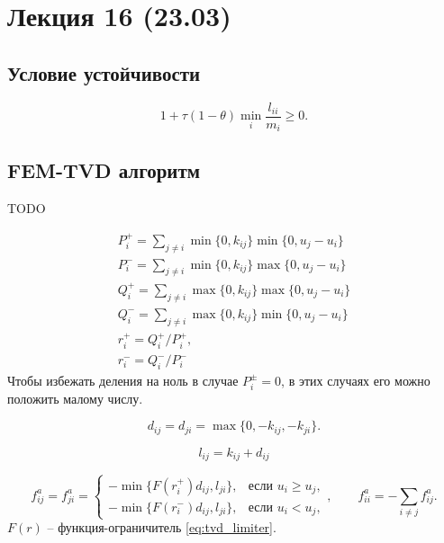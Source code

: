 \section{Лекция 16 (23.03)}

\subsection{Условие устойчивости}
\begin{equation}
\label{eq:femtvd_tau}
1 + \tau(1 - \theta)\min_i\frac{l_{ii}}{m_i} \geq 0.
\end{equation}
\subsection{FEM-TVD алгоритм}
TODO

\begin{equation}
\begin{array}{l}
P_i^{+} = \sum\limits_{j\neq i}\min\{0, k_{ij}\}\min\{0, u_j - u_i\}\\
P_i^{-} = \sum\limits_{j\neq i}\min\{0, k_{ij}\}\max\{0, u_j - u_i\}\\
Q_i^{+} = \sum\limits_{j\neq i}\max\{0, k_{ij}\}\max\{0, u_j - u_i\}\\
Q_i^{-} = \sum\limits_{j\neq i}\max\{0, k_{ij}\}\min\{0, u_j - u_i\}\\
r_i^{+} = Q_i^{+} / P_i^{+},\\
r_i^{-} = Q_i^{-} / P_i^{-}
\end{array}
\end{equation}
Чтобы избежать деления на ноль в случае $P_i^{\pm} = 0$, в этих случаях его можно положить малому числу.

\begin{equation}
d_{ij} = d_{ji} = \max\{0, -k_{ij}, -k_{ji}\}.
\end{equation}

\begin{equation}
l_{ij} = k_{ij} + d_{ij}
\end{equation}

\begin{equation}
\label{femtvd_fa}
f_{ij}^a = f_{ji}^a = \begin{cases}
-\min\{ F(r_i^+) d_{ij}, l_{ji} \}, &\text{если } u_i \geq u_j,\\
-\min\{ F(r_i^-) d_{ij}, l_{ji} \}, &\text{если } u_i < u_j,
\end{cases},
\qquad f^a_{ii} = -\sum\limits_{i\neq j} f^a_{ij}.
\end{equation}
$F(r)$ -- функция-ограничитель \cref{eq:tvd_limiter}.


